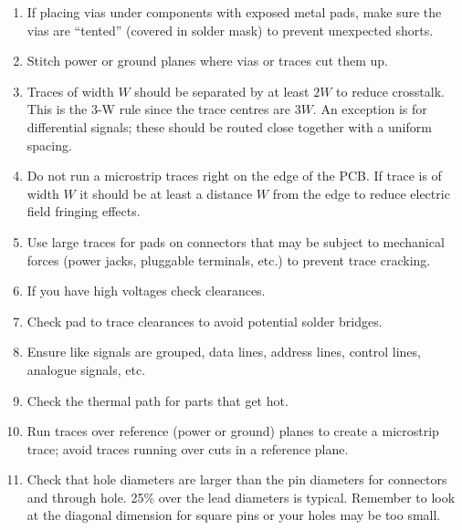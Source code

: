 \begin{enumerate}

\item If placing vias under components with exposed metal pads, make
  sure the vias are ``tented'' (covered in solder mask) to prevent
  unexpected shorts.

\item Stitch power or ground planes where vias or traces cut them up.

\item Traces of width $W$ should be separated by at least $2W$ to
  reduce crosstalk.  This is the 3-W rule since the trace centres are
  $3W$.  An exception is for differential signals; these should be
  routed close together with a uniform spacing.

\item Do not run a microstrip traces right on the edge of the PCB.  If
  trace is of width $W$ it should be at least a distance $W$ from the
  edge to reduce electric field fringing effects.

\item Use large traces for pads on connectors that may be subject to
  mechanical forces (power jacks, pluggable terminals, etc.) to
  prevent trace cracking.

\item If you have high voltages check clearances.

\item Check pad to trace clearances to avoid potential solder bridges.


\item Ensure like signals are grouped, data lines, address lines, control lines, analogue signals, etc.

\item Check the thermal path for parts that get hot.

\item Run traces over reference (power or ground) planes to create a
  microstrip trace; avoid traces running over cuts in a reference
  plane.

\item Check that hole diameters are larger than the pin diameters for
  connectors and through hole. 25\% over the lead diameters is
  typical.  Remember to look at the diagonal dimension for square pins
  or your holes may be too small.


\end{enumerate}
